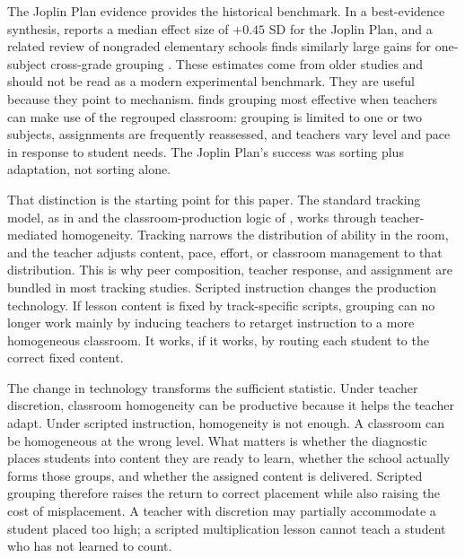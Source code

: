 \documentclass[11pt]{article}
\begin{document}
The Joplin Plan evidence provides the historical benchmark. In a best-evidence synthesis, \citet{slavin1987ability} reports a median effect size of $+0.45$ SD for the Joplin Plan, and a related review of nongraded elementary schools finds similarly large gains for one-subject cross-grade grouping \citep{gutierrezslavin1992}. These estimates come from older studies and should not be read as a modern experimental benchmark. They are useful because they point to mechanism. \citet{slavin1987ability} finds grouping most effective when teachers can make use of the regrouped classroom: grouping is limited to one or two subjects, assignments are frequently reassessed, and teachers vary level and pace in response to student needs. The Joplin Plan's success was sorting plus adaptation, not sorting alone.

That distinction is the starting point for this paper. The standard tracking model, as in \citet{duflo2011peer} and the classroom-production logic of \citet{Lazear2001}, works through teacher-mediated homogeneity. Tracking narrows the distribution of ability in the room, and the teacher adjusts content, pace, effort, or classroom management to that distribution. This is why peer composition, teacher response, and assignment are bundled in most tracking studies. Scripted instruction changes the production technology. If lesson content is fixed by track-specific scripts, grouping can no longer work mainly by inducing teachers to retarget instruction to a more homogeneous classroom. It works, if it works, by routing each student to the correct fixed content.

The change in technology transforms the sufficient statistic. Under teacher discretion, classroom homogeneity can be productive because it helps the teacher adapt. Under scripted instruction, homogeneity is not enough. A classroom can be homogeneous at the wrong level. What matters is whether the diagnostic places students into content they are ready to learn, whether the school actually forms those groups, and whether the assigned content is delivered. Scripted grouping therefore raises the return to correct placement while also raising the cost of misplacement. A teacher with discretion may partially accommodate a student placed too high; a scripted multiplication lesson cannot teach a student who has not learned to count.
\end{document}
